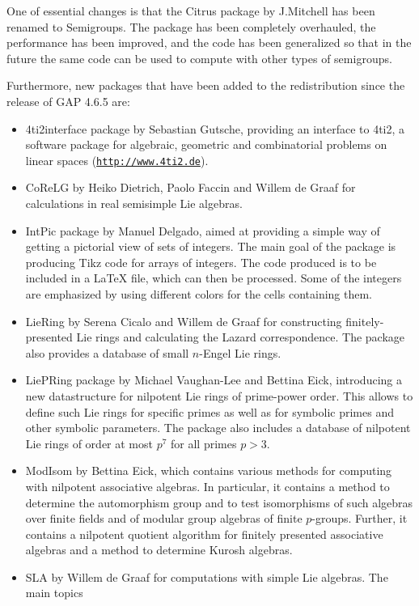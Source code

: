 \documentclass[a4paper,11pt]{report}
\begin{document}
{{{ One of essential changes is that the \textsf{Citrus} package by J.Mitchell has been renamed to \textsf{Semigroups}. The package has been completely overhauled, the performance has been
improved, and the code has been generalized so that in the future the same
code can be used to compute with other types of semigroups. 

 Furthermore, new packages that have been added to the redistribution since the
release of \textsf{GAP} 4.6.5 are: 
\begin{itemize}
\item  \textsf{4ti2interface} package by Sebastian Gutsche, providing an interface to \textsf{4ti2}, a software package for algebraic, geometric and combinatorial problems on
linear spaces (\href{http://www.4ti2.de} {\texttt{http://www.4ti2.de}}). 
\item  \textsf{CoReLG} by Heiko Dietrich, Paolo Faccin and Willem de Graaf for calculations in real
semisimple Lie algebras. 
\item  \textsf{IntPic} package by Manuel Delgado, aimed at providing a simple way of getting a
pictorial view of sets of integers. The main goal of the package is producing \textsf{Tikz} code for arrays of integers. The code produced is to be included in a {\LaTeX} file, which can then be processed. Some of the integers are emphasized by
using different colors for the cells containing them. 
\item  \textsf{LieRing} by Serena Cicalo and Willem de Graaf for constructing finitely-presented Lie
rings and calculating the Lazard correspondence. The package also provides a
database of small $n$-Engel Lie rings. 
\item  \textsf{LiePRing} package by Michael Vaughan-Lee and Bettina Eick, introducing a new
datastructure for nilpotent Lie rings of prime-power order. This allows to
define such Lie rings for specific primes as well as for symbolic primes and
other symbolic parameters. The package also includes a database of nilpotent
Lie rings of order at most $p^7$ for all primes $p > 3$. 
\item  \textsf{ModIsom} by Bettina Eick, which contains various methods for computing with nilpotent
associative algebras. In particular, it contains a method to determine the
automorphism group and to test isomorphisms of such algebras over finite
fields and of modular group algebras of finite $p$-groups. Further, it contains a nilpotent quotient algorithm for finitely
presented associative algebras and a method to determine Kurosh algebras. 
\item  \textsf{SLA} by Willem de Graaf for computations with simple Lie algebras. The main topics

\end{itemize}}}}
\end{document}
